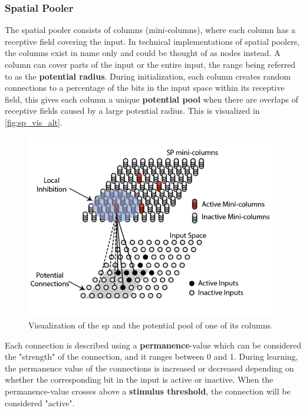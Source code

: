 \subsubsection{Spatial Pooler}
\label{sec:spatial_pooler}
The spatial pooler consists of columns (mini-columns), where each column has a receptive field covering the input. In technical implementations of spatial poolers, the columns exist in name only and could be thought of as nodes instead. A column can cover parts of the input or the entire input, the range being referred to as the \textbf{potential radius}. During initialization, each column creates random connections to a percentage of the bits in the input space within its receptive field, this gives each column a unique \textbf{potential pool} when there are overlaps of receptive fields caused by a large potential radius. This is visualized in \autoref{fig:sp_vis_alt}.\par
\begin{figure}[H]
    \centering
    \includegraphics[width=\linewidth]{resources/related_works/sp_vis_alt}
    \caption[Spatial Pooler Visualization]{Visualization of the \gls*{sp} and the potential pool of one of its columns.}
    \label{fig:sp_vis_alt}
\end{figure}
Each connection is described using a \textbf{permanence}-value which can be considered the "strength" of the connection, and it ranges between 0 and 1. During learning, the permanence value of the connections is increased or decreased depending on whether the corresponding bit in the input is active or inactive. When the permanence-value crosses above a \textbf{stimulus threshold}, the connection will be considered "active".

